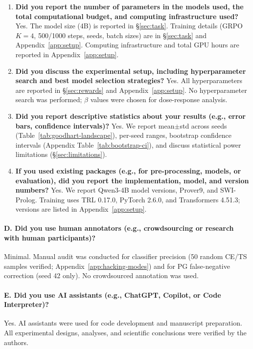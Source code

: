 \begin{enumerate}[label=C\arabic*.,leftmargin=*]
\item \textbf{Did you report the number of parameters in the models used, the total computational budget, and computing infrastructure used?}
Yes. The model size (4B) is reported in \S\ref{sec:task}. Training details (GRPO $K{=}4$, 500/1000 steps, seeds, batch sizes) are in \S\ref{sec:task} and Appendix~\ref{app:setup}. Computing infrastructure and total GPU hours are reported in Appendix~\ref{app:setup}.

\item \textbf{Did you discuss the experimental setup, including hyperparameter search and best model selection strategies?}
Yes. All hyperparameters are reported in \S\ref{sec:rewards} and Appendix~\ref{app:setup}. No hyperparameter search was performed; $\beta$ values were chosen for dose-response analysis.

\item \textbf{Did you report descriptive statistics about your results (e.g., error bars, confidence intervals)?}
Yes. We report mean$\pm$std across seeds (Table~\ref{tab:goodhart-landscape}), per-seed ranges, bootstrap confidence intervals (Appendix Table~\ref{tab:bootstrap-ci}), and discuss statistical power limitations (\S\ref{sec:limitations}).

\item \textbf{If you used existing packages (e.g., for pre-processing, models, or evaluation), did you report the implementation, model, and version numbers?}
Yes. We report Qwen3-4B model versions, Prover9, and SWI-Prolog. Training uses TRL 0.17.0, PyTorch 2.6.0, and Transformers 4.51.3; versions are listed in Appendix~\ref{app:setup}.
\end{enumerate}

\paragraph{D. Did you use human annotators (e.g., crowdsourcing or research with human participants)?}
Minimal. Manual audit was conducted for classifier precision (50 random CE/TS samples verified; Appendix~\ref{app:hacking-modes}) and for PG false-negative correction (seed 42 only). No crowdsourced annotation was used.

\paragraph{E. Did you use AI assistants (e.g., ChatGPT, Copilot, or Code Interpreter)?}
Yes. AI assistants were used for code development and manuscript preparation. All experimental designs, analyses, and scientific conclusions were verified by the authors.
